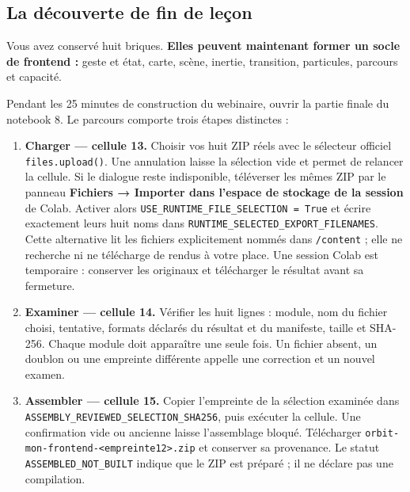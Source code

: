 \documentclass[
  canadien,
  11pt,
  a4paper,
]{report}
\providecommand{\tightlist}{%
  \setlength{\itemsep}{0pt}\setlength{\parskip}{0pt}}
\begin{document}
\subsection{La découverte de fin de
leçon}\label{la-duxe9couverte-de-fin-de-leuxe7on}

Vous avez conservé huit briques. \textbf{Elles peuvent maintenant former
un socle de frontend :} geste et état, carte, scène, inertie,
transition, particules, parcours et capacité.

Pendant les 25 minutes de construction du webinaire, ouvrir la partie
finale du notebook 8. Le parcours comporte trois étapes distinctes :

\begin{enumerate}
\def\labelenumi{\arabic{enumi}.}
\tightlist
\item
  \textbf{Charger --- cellule 13.} Choisir vos huit ZIP réels avec le
  sélecteur officiel \texttt{files.upload()}. Une annulation laisse la
  sélection vide et permet de relancer la cellule. Si le dialogue reste
  indisponible, téléverser les mêmes ZIP par le panneau \textbf{Fichiers
  → Importer dans l'espace de stockage de la session} de Colab. Activer
  alors \texttt{USE\_\allowbreak{}RUNTIME\_\allowbreak{}FILE\_\allowbreak{}SELECTION\ =\ True} et écrire
  exactement leurs huit noms dans
  \texttt{RUNTIME\_\allowbreak{}SELECTED\_\allowbreak{}EXPORT\_\allowbreak{}FILENAMES}. Cette alternative lit
  les fichiers explicitement nommés dans \texttt{/\allowbreak{}content} ; elle ne
  recherche ni ne télécharge de rendus à votre place. Une session Colab
  est temporaire : conserver les originaux et télécharger le résultat
  avant sa fermeture.
\item
  \textbf{Examiner --- cellule 14.} Vérifier les huit lignes : module,
  nom du fichier choisi, tentative, formats déclarés du résultat et du
  manifeste, taille et SHA-256. Chaque module doit apparaître une seule
  fois. Un fichier absent, un doublon ou une empreinte différente
  appelle une correction et un nouvel examen.
\item
  \textbf{Assembler --- cellule 15.} Copier l'empreinte de la sélection
  examinée dans \texttt{ASSEMBLY\_\allowbreak{}REVIEWED\_\allowbreak{}SELECTION\_\allowbreak{}SHA256}, puis
  exécuter la cellule. Une confirmation vide ou ancienne laisse
  l'assemblage bloqué. Télécharger
  \texttt{orbit-mon-frontend-\textless{}empreinte12\textgreater{}.zip}
  et conserver sa provenance. Le statut \texttt{ASSEMBLED\_\allowbreak{}NOT\_\allowbreak{}BUILT}
  indique que le ZIP est préparé ; il ne déclare pas une compilation.
\end{enumerate}
\end{document}
